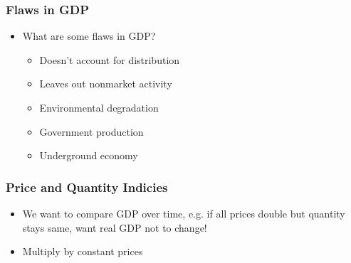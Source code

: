 \documentclass{beamer}
\begin{document}
\begin{frame}
\frametitle[alignment=center]{Flaws in GDP}
\begin{itemize}
\item What are some flaws in GDP?
\begin{itemize}
\item Doesn't account for distribution
\bigskip
\item Leaves out nonmarket activity
\bigskip
\item Environmental degradation
\bigskip
\item Government production
\bigskip
\item Underground economy 
\end{itemize}
\end{itemize}
\end{frame}

\begin{frame}
\frametitle[alignment=center]{Price and Quantity Indicies}
\begin{itemize}
\item We want to compare GDP over time, e.g. if all prices double but quantity stays same, want real GDP not to change!
\bigskip
\item Multiply by constant prices
\end{itemize}
\end{frame}
\end{document}
